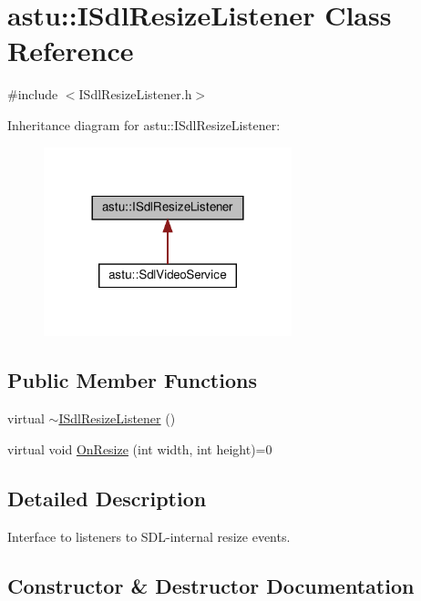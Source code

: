 \hypertarget{classastu_1_1ISdlResizeListener}{}\section{astu\+:\+:I\+Sdl\+Resize\+Listener Class Reference}
\label{classastu_1_1ISdlResizeListener}


{\ttfamily \#include $<$I\+Sdl\+Resize\+Listener.\+h$>$}



Inheritance diagram for astu\+:\+:I\+Sdl\+Resize\+Listener\+:\nopagebreak
\begin{figure}[H]
\begin{center}
\leavevmode
\includegraphics[width=204pt]{classastu_1_1ISdlResizeListener__inherit__graph}
\end{center}
\end{figure}
\subsection*{Public Member Functions}
\begin{DoxyCompactItemize}
\item 
virtual \hyperlink{classastu_1_1ISdlResizeListener_aa03af6aa804d297924a403e4e715399a}{$\sim$\+I\+Sdl\+Resize\+Listener} ()
\item 
virtual void \hyperlink{classastu_1_1ISdlResizeListener_ae938c37edfecbc9f3bd60a4cb3b2419c}{On\+Resize} (int width, int height)=0
\end{DoxyCompactItemize}


\subsection{Detailed Description}
Interface to listeners to S\+D\+L-\/internal resize events. 

\subsection{Constructor \& Destructor Documentation}
\mbox{\label{classastu_1_1ISdlResizeListener_aa03af6aa804d297924a403e4e715399a}} 
